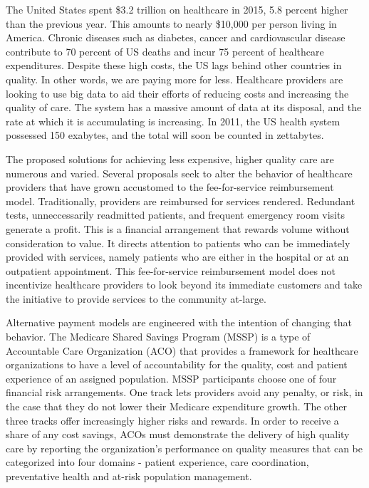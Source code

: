 \documentclass[sigconf]{acmart}
\begin{document}
 The United States spent \$3.2 trillion on healthcare in 2015, 5.8 percent higher than the previous year\cite{editor01}. This amounts to nearly \$10,000 per person living in America\cite{editor01}. Chronic diseases such as diabetes, cancer and cardiovascular disease contribute to 70 percent of US deaths and incur 75 percent of healthcare expenditures\cite{editor11}. Despite these high costs, the US lags behind other countries in quality\cite{editor06}. In other words, we are paying more for less. Healthcare providers are looking to use big data to aid their efforts of reducing costs and increasing the quality of care. The system has a massive amount of data at its disposal, and the rate at which it is accumulating is increasing. In 2011, the US health system possessed 150 exabytes, and the total will soon be counted in zettabytes\cite{editor12}.

 The proposed solutions for achieving less expensive, higher quality care are numerous and varied. Several proposals seek to alter the behavior of healthcare providers that have grown accustomed to the fee-for-service reimbursement model. Traditionally, providers are reimbursed for services rendered. Redundant tests, unneccessarily readmitted patients, and frequent emergency room visits generate a profit. This is a financial arrangement that rewards volume without consideration to value\cite{editor02}. It directs attention to patients who can be immediately provided with services, namely patients who are either in the hospital or at an outpatient appointment. This fee-for-service reimbursement model does not incentivize healthcare providers to look beyond its immediate customers and take the initiative to provide services to the community at-large.

 Alternative payment models are engineered with the intention of changing that behavior. The Medicare Shared Savings Program (MSSP) is a type of Accountable Care Organization (ACO) that provides a framework for healthcare organizations to have a level of accountability for the quality, cost and patient experience of an assigned population. MSSP participants choose one of four financial risk arrangements. One track lets providers avoid any penalty, or risk, in the case that they do not lower their Medicare expenditure growth. The other three tracks offer increasingly higher risks and rewards\cite{editor03}. In order to receive a share of any cost savings, ACOs must demonstrate the delivery of high quality care by reporting the organization's performance on quality measures that can be categorized into four domains - patient experience, care coordination, preventative health and at-risk population management\cite{editor04}.
\end{document}

